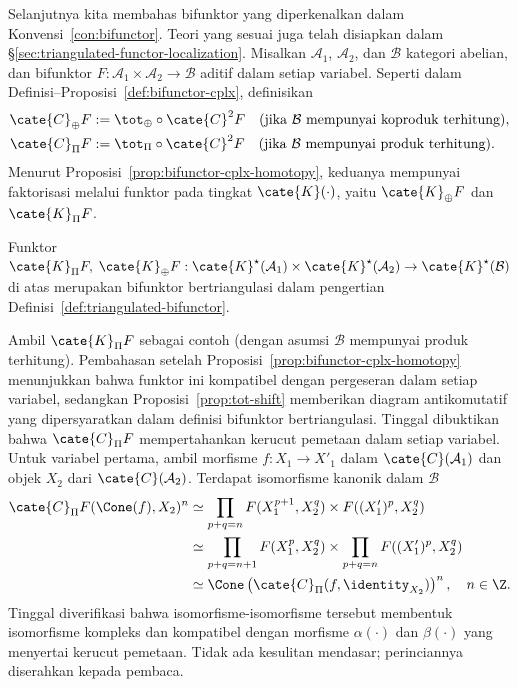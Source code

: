 Selanjutnya kita membahas bifunktor yang diperkenalkan dalam
Konvensi~\ref{con:bifunctor}. Teori yang sesuai juga telah disiapkan dalam
\S\ref{sec:triangulated-functor-localization}. Misalkan $\mathcal{A}_1$,
$\mathcal{A}_2$, dan $\mathcal{B}$ kategori abelian, dan bifunktor
$F:\mathcal{A}_1\times\mathcal{A}_2\to\mathcal{B}$ aditif dalam setiap
variabel. Seperti dalam Definisi--Proposisi~\ref{def:bifunctor-cplx}, definisikan
\begin{equation}\label{eqn:totCF}\begin{aligned}
		\cate{C}_{\oplus} F & := \tot_{\oplus} \circ \cate{C}^2 F \quad \text{(jika $\mathcal{B}$ mempunyai koproduk terhitung)}, \\
		\cate{C}_{\Pi} F & := \tot_{\Pi} \circ \cate{C}^2 F \quad \text{(jika $\mathcal{B}$ mempunyai produk terhitung)}.
\end{aligned}\end{equation}
Menurut Proposisi~\ref{prop:bifunctor-cplx-homotopy}, keduanya mempunyai
faktorisasi melalui funktor pada tingkat $\cate{K}(\cdot)$, yaitu
$\cate{K}_{\oplus}F$ dan $\cate{K}_{\Pi}F$.

\begin{proposisi}
	Funktor
	$\cate{K}_{\Pi}F,\;\cate{K}_{\oplus}F:
	\cate{K}^\star(\mathcal{A}_1)\times\cate{K}^\star(\mathcal{A}_2)
	\to\cate{K}^\star(\mathcal{B})$ di atas merupakan bifunktor bertriangulasi
dalam pengertian Definisi~\ref{def:triangulated-bifunctor}.
\end{proposisi}
\begin{bukti}
	Ambil $\cate{K}_{\Pi}F$ sebagai contoh (dengan asumsi $\mathcal{B}$
	mempunyai produk terhitung). Pembahasan setelah
	Proposisi~\ref{prop:bifunctor-cplx-homotopy} menunjukkan bahwa funktor ini
	kompatibel dengan pergeseran dalam setiap variabel, sedangkan
	Proposisi~\ref{prop:tot-shift} memberikan diagram antikomutatif yang
	dipersyaratkan dalam definisi bifunktor bertriangulasi. Tinggal dibuktikan
	bahwa $\cate{C}_{\Pi}F$ mempertahankan kerucut pemetaan dalam setiap
	variabel. Untuk variabel pertama, ambil morfisme
	$f:X_1\to X'_1$ dalam $\cate{C}(\mathcal{A}_1)$ dan objek $X_2$ dari
	$\cate{C}(\mathcal{A}_2)$. Terdapat isomorfisme kanonik dalam $\mathcal{B}$
	\begin{align*}
		\cate{C}_{\Pi}F(\Cone(f), X_2)^n & \simeq \prod_{p+q=n} F(X_1^{p+1}, X_2^q ) \times F( (X'_1)^p, X_2^q ) \\
		& \simeq \prod_{p+q=n+1} F( X_1^p, X_2^q ) \times \prod_{p+q=n} F( (X'_1)^p, X_2^q ) \\
		& \simeq \Cone\left(\cate{C}_{\Pi}(f, \identity_{X_2}) \right)^n , \quad n \in \Z.
	\end{align*}
	Tinggal diverifikasi bahwa isomorfisme-isomorfisme tersebut
	membentuk isomorfisme kompleks dan kompatibel dengan morfisme
	$\alpha(\cdot)$ dan $\beta(\cdot)$ yang menyertai kerucut pemetaan. Tidak
	ada kesulitan mendasar; perinciannya diserahkan kepada pembaca.
\end{bukti}

